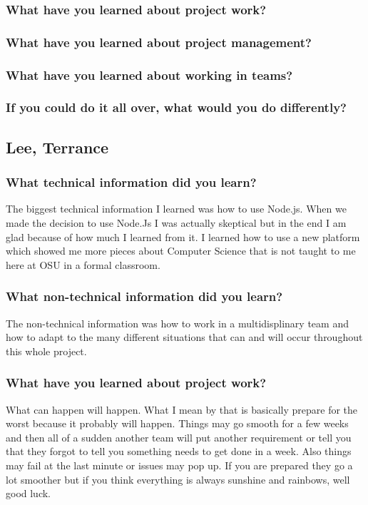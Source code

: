 \documentclass[10pt,draftclsnofoot,onecolumn]{IEEEtran}
\begin{document}
\subsubsection{What have you learned about project work?}
\subsubsection{What have you learned about project management?}
\subsubsection{What have you learned about working in teams?}
\subsubsection{If you could do it all over, what would you do differently?}


\subsection{Lee, Terrance}

\subsubsection{What technical information did you learn?}
The biggest technical information I learned was how to use Node.js.  When we made the decision to use Node.Js I was actually skeptical but in the end I am glad because of how much I learned from it.  I learned how to use a new platform which showed me more pieces about Computer Science that is not taught to me here at OSU in a formal classroom.  
\subsubsection{What non-technical information did you learn?}
The non-technical information was how to work in a multidisplinary team and how to adapt to the many different situations that can and will occur throughout this whole project.  
\subsubsection{What have you learned about project work?}
What can happen will happen.  What I mean by that is basically prepare for the worst because it probably will happen.  Things may go smooth for a few weeks and then all of a sudden another team will put another requirement or tell you that they forgot to tell you something needs to get done in a week. Also things may fail at the last minute or issues may pop up.  If you are prepared they go a lot smoother but if you think everything is always sunshine and rainbows, well good luck.  
\end{document}
